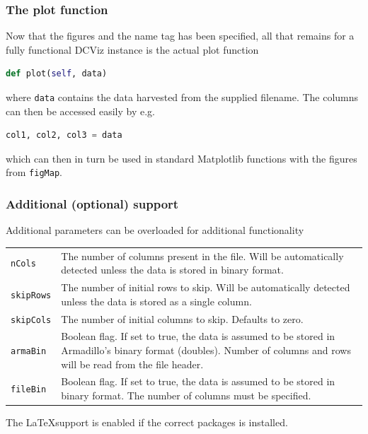 \subsubsection{The plot function}

Now that the figures and the name tag has been specified, all that remains for a fully functional DCViz instance is the actual plot function

\begin{lstlisting}[language=Python, otherkeywords={self}]
def plot(self, data)
\end{lstlisting}

where \verb+data+ contains the data harvested from the supplied filename. The columns can then be accessed easily by e.g.

\begin{lstlisting}[language=Python]
col1, col2, col3 = data
\end{lstlisting}

which can then in turn be used in standard Matplotlib functions with the figures from \verb+figMap+.

\subsubsection{Additional (optional) support}

Additional parameters can be overloaded for additional functionality

\begin{small}
\begin{tabular}{lp{14cm - 7pt}}
\verb+nCols+ & The number of columns present in the file. Will be automatically detected unless the data is stored in binary format.\\
\verb+skipRows+ & The number of initial rows to skip. Will be automatically detected unless the data is stored as a single column.\\
\verb+skipCols+ & The number of initial columns to skip. Defaults to zero.\\
\verb+armaBin+ & Boolean flag. If set to true, the data is assumed to be stored in Armadillo's binary format (doubles). Number of columns and rows will be read from the file header.\\
\verb+fileBin+ & Boolean flag. If set to true, the data is assumed to be stored in binary format. The number of columns must be specified.
\end{tabular}
\end{small}

The \LaTeX support is enabled if the correct packages is installed.

